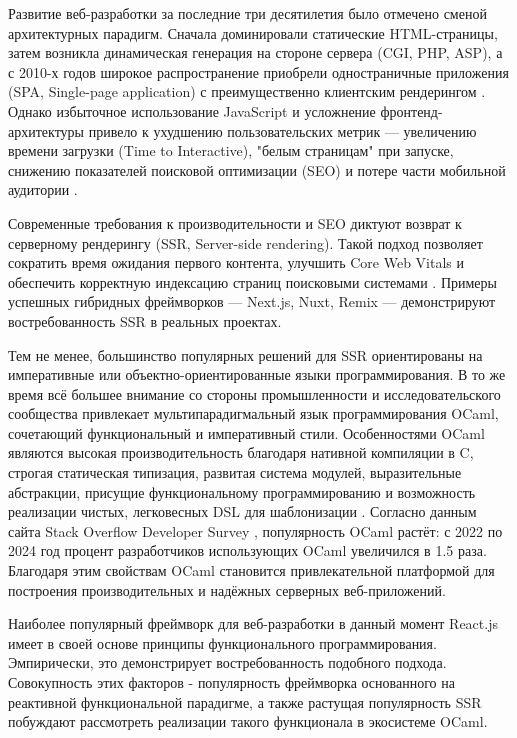 Развитие веб-разработки за последние три десятилетия было отмечено сменой архитектурных парадигм.
Сначала доминировали статические HTML-страницы, затем возникла динамическая генерация на стороне сервера (CGI, PHP, ASP), а с 2010-х годов широкое распространение приобрели одностраничные приложения (SPA, Single-page application) с преимущественно клиентским рендерингом \cite{fowler2012patterns, kolce2018javascript}.
Однако избыточное использование JavaScript и усложнение фронтенд-архитектуры привело к ухудшению пользовательских метрик — увеличению времени загрузки (Time to Interactive), "белым страницам" при запуске, снижению показателей поисковой оптимизации (SEO) и потере части мобильной аудитории \cite{OsmaniJavaScript2019}.

Современные требования к производительности и SEO диктуют возврат к серверному рендерингу (SSR, Server-side rendering).
Такой подход позволяет сократить время ожидания первого контента, улучшить Core Web Vitals и обеспечить корректную индексацию страниц поисковыми системами \cite{HTTPArchive2022}.
Примеры успешных гибридных фреймворков — Next.js, Nuxt, Remix — демонстрируют востребованность SSR в реальных проектах\cite{jartarghar2022react}.

Тем не менее, большинство популярных решений для SSR ориентированы на императивные или объектно-ориентированные языки программирования.
В то же время всё большее внимание со стороны промышленности и исследовательского сообщества привлекает мультипарадигмальный язык программирования OCaml, сочетающий функциональный и императивный стили.
Особенностями OCaml являются высокая производительность благодаря нативной компиляции в C, строгая статическая типизация, развитая система модулей, выразительные абстракции, присущие функциональному программированию и возможность реализации чистых, легковесных DSL для шаблонизации \cite{minsky2013real}.
Согласно данным сайта Stack Overflow Developer Survey \cite{StackOverflow2022}, популярность OCaml растёт: с 2022 по 2024 год процент разработчиков использующих OCaml увеличился в 1.5 раза.
Благодаря этим свойствам OCaml становится привлекательной платформой для построения производительных и надёжных серверных веб-приложений.

Наиболее популярный фреймворк для веб-разработки в данный момент React.js имеет в своей основе принципы функционального программирования\cite{statista2024}.
Эмпирически, это демонстрирует востребованность подобного подхода.
Совокупность этих факторов - популярность фреймворка основанного на реактивной функциональной парадигме, а также растущая популярность SSR побуждают рассмотреть реализации такого функционала в экосистеме OCaml.

